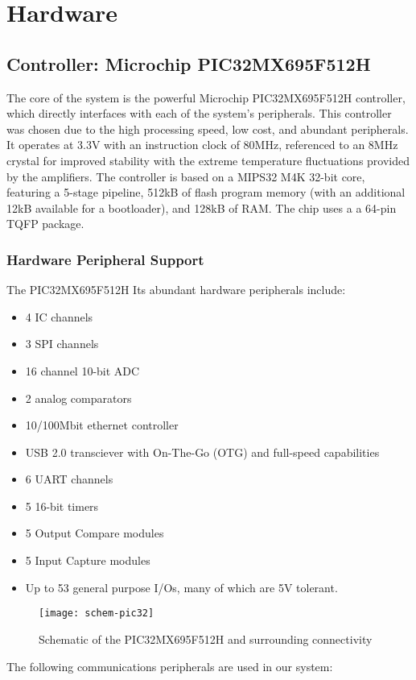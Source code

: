 \chapter{Hardware}

\section{Controller: Microchip PIC32MX695F512H}
\label{sec:pic32}
The core of the system is the powerful Microchip PIC32MX695F512H controller, which directly interfaces with each of the system's peripherals. This controller was chosen due to the high processing speed, low cost, and abundant peripherals. It operates at 3.3V with an instruction clock of 80MHz, referenced to an 8MHz crystal for improved stability with the extreme temperature fluctuations provided by the amplifiers. The controller is based on a MIPS32 M4K 32-bit core, featuring a 5-stage pipeline, 512kB of flash program memory (with an additional 12kB available for a bootloader), and 128kB of RAM. The chip uses a a 64-pin TQFP package.
\subsection{Hardware Peripheral Support}
The PIC32MX695F512H Its abundant hardware peripherals include:
\begin{itemize}
\item 4 IC channels
\item 3 SPI channels
\item 16 channel 10-bit ADC
\item 2 analog comparators
\item 10/100Mbit ethernet controller
\item USB 2.0 transciever with On-The-Go (OTG) and full-speed capabilities
\item 6 UART channels
\item 5 16-bit timers
\item 5 Output Compare modules
\item 5 Input Capture modules
\item Up to 53 general purpose I/Os, many of which are 5V tolerant. 
\end{itemize}
\begin{figure}[H]
	\centering
	\texttt{[image: schem-pic32]}
	\caption[Schematic -- Microcontroller]%
	{Schematic of the PIC32MX695F512H and surrounding connectivity}
\end{figure}
The following communications peripherals are used in our system:
